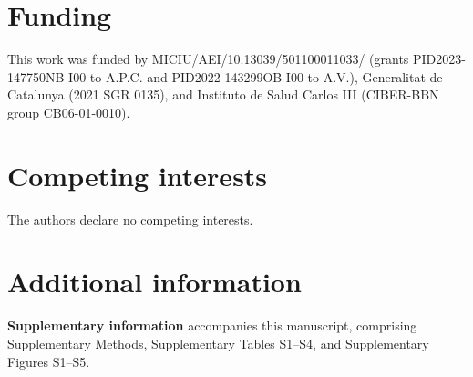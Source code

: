 \documentclass{article}
\begin{document}
\section*{Funding}
This work was funded by MICIU/AEI/10.13039/501100011033/ (grants PID2023-147750NB-I00 to A.P.C. and PID2022-143299OB-I00 to A.V.), Generalitat de Catalunya (2021 SGR 0135), and Instituto de Salud Carlos III (CIBER-BBN group CB06-01-0010).

\section*{Competing interests}
The authors declare no competing interests.

\section*{Additional information}
\textbf{Supplementary information} accompanies this manuscript, comprising Supplementary Methods, Supplementary Tables S1--S4, and Supplementary Figures S1--S5.



\end{document}
